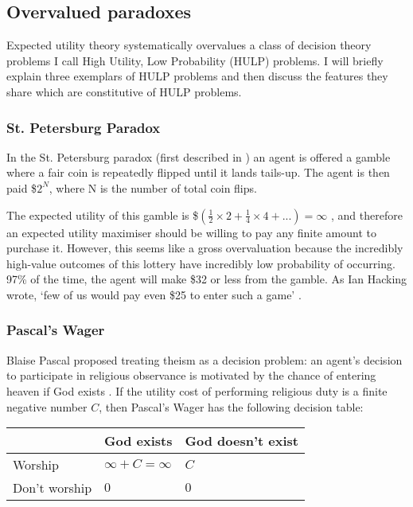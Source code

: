 \documentclass{article}
\begin{document}
\subsection {Overvalued paradoxes}

Expected utility theory systematically overvalues a class of decision theory problems I call High Utility, Low Probability (HULP) problems. I will briefly explain three exemplars of HULP problems and then discuss the features they share which are constitutive of HULP problems.

\subsubsection {St. Petersburg Paradox}

In the St. Petersburg paradox (first described in \citep{bernoulli1954exposition}) an agent is offered a gamble where a fair coin is repeatedly flipped until it lands tails-up. The agent is then paid \$\(2^N\), where N is the number of total coin flips.

The expected utility of this gamble is \$\((\frac{1}{2}\times2 + \frac{1}{4}\times4+...) = \infty\) \citep{resnik1987choices}, and therefore an expected utility maximiser should be willing to pay any finite amount to purchase it. However, this seems like a gross overvaluation because the incredibly high-value outcomes of this lottery have incredibly low probability of occurring. 97\% of the time, the agent will make \$32 or less from the gamble. As Ian Hacking wrote, `few of us would pay even \$25 to enter such
 a game' \citep{hacking1980strange}.

\subsubsection {Pascal's Wager}

Blaise Pascal proposed treating theism as a decision problem: an agent's decision to participate in religious observance is motivated by the chance of entering heaven if God exists \citep{pascal1852pensees}. If the utility cost of performing religious duty is a finite negative number \(C\), then Pascal's Wager has the following decision table:

\begin{center}
\begin{tabular}{ | l | l | l |}
  \hline
    & God exists & God doesn't exist \\ \hline
  Worship & \(\infty+C=\infty\) & \(C\) \\ \hline
  Don't worship & \(0\)  & \(0\) \\
  \hline
\end{tabular}
\end{center}
\end{document}
